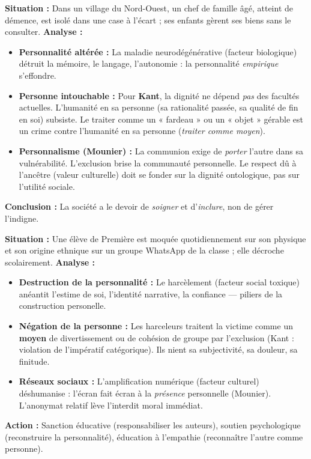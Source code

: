 \documentclass[11pt]{article}
\begin{document}
\begin{exemplebox}
\textbf{Situation :} Dans un village du Nord-Ouest, un chef de famille âgé, atteint de démence, est isolé dans une case à l'écart ; ses enfants gèrent ses biens sans le consulter.
\textbf{Analyse :}
\begin{itemize}
    \item \textbf{Personnalité altérée :} La maladie neurodégénérative (facteur biologique) détruit la mémoire, le langage, l'autonomie : la personnalité \emph{empirique} s'effondre.
    \item \textbf{Personne intouchable :} Pour \textbf{Kant}, la dignité ne dépend \emph{pas} des facultés actuelles. L'humanité en sa personne (sa rationalité passée, sa qualité de fin en soi) subsiste. Le traiter comme un « fardeau » ou un « objet » gérable est un crime contre l'humanité en sa personne (\emph{traiter comme moyen}).
    \item \textbf{Personnalisme (Mounier) :} La communion exige de \emph{porter} l'autre dans sa vulnérabilité. L'exclusion brise la communauté personnelle. Le respect dû à l'ancêtre (valeur culturelle) doit se fonder sur la dignité ontologique, pas sur l'utilité sociale.
\end{itemize}
\textbf{Conclusion :} La société a le devoir de \emph{soigner} et d'\emph{inclure}, non de gérer l'indigne.
\end{exemplebox}

\begin{exemplebox}
\textbf{Situation :} Une élève de Première est moquée quotidiennement sur son physique et son origine ethnique sur un groupe WhatsApp de la classe ; elle décroche scolairement.
\textbf{Analyse :}
\begin{itemize}
    \item \textbf{Destruction de la personnalité :} Le harcèlement (facteur social toxique) anéantit l'estime de soi, l'identité narrative, la confiance — piliers de la construction personelle.
    \item \textbf{Négation de la personne :} Les harceleurs traitent la victime comme un \textbf{moyen} de divertissement ou de cohésion de groupe par l'exclusion (Kant : violation de l'impératif catégorique). Ils nient sa subjectivité, sa douleur, sa finitude.
    \item \textbf{Réseaux sociaux :} L'amplification numérique (facteur culturel) déshumanise : l'écran fait écran à la \emph{présence} personnelle (Mounier). L'anonymat relatif lève l'interdit moral immédiat.
\end{itemize}
\textbf{Action :} Sanction éducative (responsabiliser les auteurs), soutien psychologique (reconstruire la personnalité), éducation à l'empathie (reconnaître l'autre comme personne).
\end{exemplebox}
\end{document}
